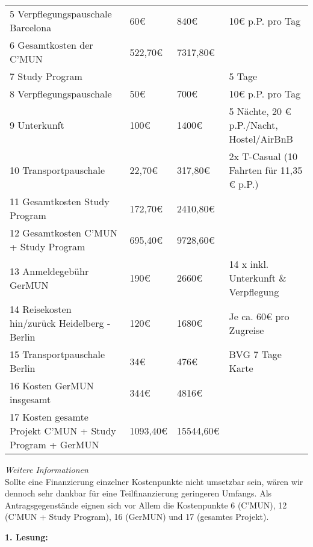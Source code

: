 {\begin{tabular}{p{4cm} p{1cm} p{1cm} p{9cm}}
        5 Verpflegungspauschale Barcelona & 60€ & 840€ & 10€ p.P. pro Tag\\
        6 Gesamtkosten der C'MUN & 522,70€ & 7317,80€ &\\
        7 Study Program & & & 5 Tage\\
        8 Verpflegungspauschale & 50€ & 700€ & 10€ p.P. pro Tag\\
        9 Unterkunft & 100€ & 1400€ & 5 Nächte, 20 € p.P./Nacht, Hostel/AirBnB\\
        10 Transportpauschale & 22,70€ & 317,80€ & 2x T-Casual (10 Fahrten für 11,35 € p.P.)\\
        11 Gesamtkosten Study Program & 172,70€ & 2410,80€ & \\
        12 Gesamtkosten C'MUN + Study Program & 695,40€ & 9728,60€ &\\
        13 Anmeldegebühr GerMUN & 190€ & 2660€ & 14 x inkl. Unterkunft \& Verpflegung\\
        14 Reisekosten hin/zurück Heidelberg - Berlin & 120€ & 1680€ & Je ca. 60€ pro Zugreise\\
        15 Transportpauschale Berlin & 34€ & 476€ & BVG 7 Tage Karte\\
        16 Kosten GerMUN insgesamt & 344€ & 4816€ &\\
        17 Kosten gesamte Projekt C'MUN + Study Program + GerMUN & 1093,40€ & 15544,60€ &\\
    \end{tabular}
    \emph{Weitere Informationen}\\
    Sollte eine Finanzierung einzelner Kostenpunkte nicht umsetzbar sein, wären wir dennoch sehr dankbar für eine Teilfinanzierung geringeren Umfangs. Als Antragsgegenstände eignen sich vor Allem die Kostenpunkte 6 (C’MUN), 12 (C’MUN + Study Program), 16 (GerMUN) und 17 (gesamtes Projekt).
}{
    \textbf{1. Lesung:}\\
    \ul{
        {}}
}
